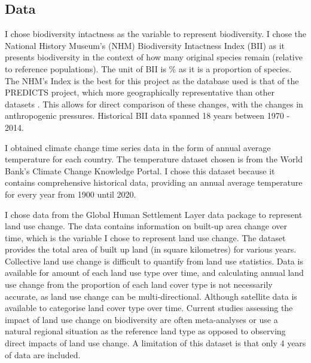 \documentclass[11pt, a4paper, titlepage]{article}
\begin{document}
	\subsection*{Data}
	I chose biodiversity intactness as the variable to represent biodiversity. I chose the National History Museum's (NHM) Biodiversity Intactness Index (BII)\citep{phillips2021} as it presents biodiversity in the context of how many original species remain (relative to reference populations). The unit of BII is \% as it is a proportion of species. The NHM's Index is the best for this project as the database used is that of the PREDICTS project, which more geographically representative than other datasets \citep{purvis2018modelling}. This allows for direct comparison of these changes, with the changes in anthropogenic pressures. Historical BII data spanned 18 years between 1970 - 2014. 
	
	I obtained climate change time series data in the form of annual average temperature for each country. The temperature dataset chosen is from the World Bank's Climate Change Knowledge Portal. I chose this dataset because it contains comprehensive historical data, providing an annual average temperature for every year from 1900 until 2020. 
	
	I chose data from the Global Human Settlement Layer data package \citep{JRC117104} to represent land use change. The data contains information on built-up area change over time, which is the variable I chose to represent land use change. The dataset provides the total area of built up land (in square kilometres) for various years. Collective land use change is difficult to quantify from land use statistics. Data is available for amount of each land use type over time, and calculating annual land use change from the proportion of each land cover type is not necessarily accurate, as land use change can be multi-directional. Although satellite data is available to categorise land cover type over time. Current studies assessing the impact of land use change on biodiversity are often meta-analyses or use a natural regional situation as the reference land type \citep{de2013land} as opposed to observing direct impacts of land use change. A limitation of this dataset is that only 4 years of data are included. 
	
\end{document}
